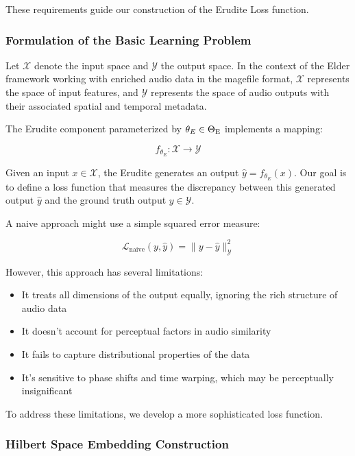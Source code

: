 These requirements guide our construction of the Erudite Loss function.

\subsubsection{Formulation of the Basic Learning Problem}

Let $\mathcal{X}$ denote the input space and $\mathcal{Y}$ the output space. In the context of the Elder framework working with enriched audio data in the magefile format, $\mathcal{X}$ represents the space of input features, and $\mathcal{Y}$ represents the space of audio outputs with their associated spatial and temporal metadata.

The Erudite component parameterized by $\theta_E \in \Theta_{\text{E}}$ implements a mapping:

\begin{equation}
f_{\theta_E}: \mathcal{X} \rightarrow \mathcal{Y}
\end{equation}

Given an input $x \in \mathcal{X}$, the Erudite generates an output $\hat{y} = f_{\theta_E}(x)$. Our goal is to define a loss function that measures the discrepancy between this generated output $\hat{y}$ and the ground truth output $y \in \mathcal{Y}$.

A naive approach might use a simple squared error measure:

\begin{equation}
\mathcal{L}_{\text{naive}}(y, \hat{y}) = \|y - \hat{y}\|_{\mathcal{Y}}^2
\end{equation}

However, this approach has several limitations:

\begin{itemize}
\item It treats all dimensions of the output equally, ignoring the rich structure of audio data
\item It doesn't account for perceptual factors in audio similarity
\item It fails to capture distributional properties of the data
\item It's sensitive to phase shifts and time warping, which may be perceptually insignificant
\end{itemize}

To address these limitations, we develop a more sophisticated loss function.

\subsubsection{Hilbert Space Embedding Construction}

